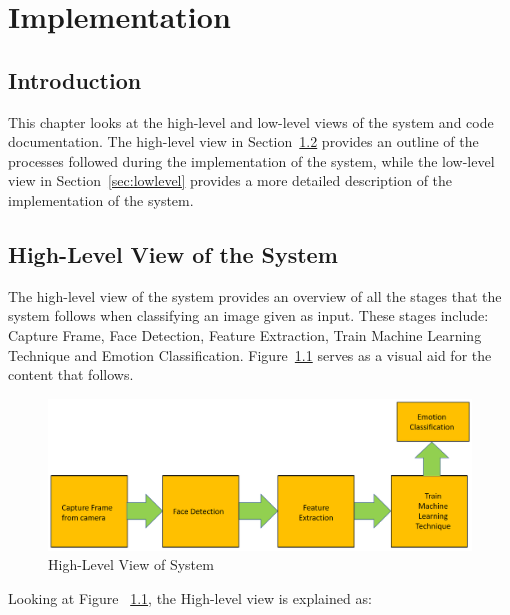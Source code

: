 \chapter{Implementation} %
%


\section{Introduction} %
This chapter looks at the high-level and low-level views of the system and
code documentation. The high-level view in Section~\ref{sec:highlevel} provides an outline
of the processes followed during the implementation of the system, while
the low-level view in Section~\ref{sec:lowlevel} provides a more detailed description of
the implementation of the system.   

\section{High-Level View of the System}\label{sec:highlevel}
The high-level view of the system provides an overview of all the stages that the system follows when classifying an image given as input. These stages include: Capture Frame, Face Detection, Feature Extraction, Train Machine Learning Technique and Emotion Classification. Figure~\ref{fig: highlevel} serves as a visual aid for the content that follows.
\begin{figure}[H]
  \centering
  \includegraphics[scale=0.2]{pres1}
  \caption{High-Level View of System}
  \label{fig: highlevel}
\end{figure} 
Looking at Figure ~\ref{fig: highlevel}, the High-level view is explained as:

